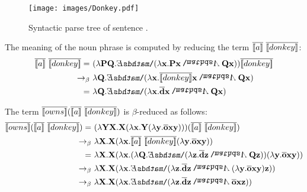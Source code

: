 \begin{figure}[h!]
 \centering
    \texttt{[image: images/Donkey.pdf]}
\caption{Syntactic parse tree of sentence .} \label{fig:donkey-copy}
\end{figure}

\begin{example}

The meaning of the noun phrase  is computed by reducing the term $\overline{[\![a]\!]} \ \overline{[\![donkey]\!]} $:
\begin{align*}
 \tr{\I{a}} \ \tr{\I{donkey}}   = \ & (\lambda \P2 \Q2. \ex2 (\lambda \x2.  \P2 \x2 \cnj2 \Q2 \x2 ) ) \tr{\I{donkey}}   \\
 \bconv \ &  \lambda  \Q2. \ex2 (\lambda \x2.  \tr{\I{donkey}} \x2  \cnj2  \Q2 \x2 ) \\
= \ &  \lambda  \Q2. \ex2 (\lambda \x2.  \tr{\cdonkey} \x2  \cnj2  \Q2 \x2 )
\end{align*}

The term $ \tr{\I{owns}}  (\tr{\I{a}} \ \tr{\I{donkey}}) $ is $\beta$-reduced as follows:
\begin{align*}
\tr{\I{owns}}  (\tr{\I{a}} \ \tr{\I{donkey}} ) = \ & ( \lambda \Y2 \X2. \X2 ( \lambda \x2. \Y2 (\lambda \y2.  \tr{\cown}  \x2 \y2 )))  (\tr{\I{a}} \ \tr{\I{donkey}} ) \\
\bconv \ &   \lambda \X2. \X2 ( \lambda \x2. \tr{\I{a}} \ \tr{\I{donkey}} (\lambda \y2.  \tr{\cown}  \x2 \y2 ))   \\
= \ &  \lambda \X2. \X2 ( \lambda \x2. ( \lambda  \Q2. \ex2 (\lambda \z2.  \tr{\cdonkey} \z2 \cnj2 \Q2 \z2 ) ) (\lambda \y2.  \tr{\cown}  \x2 \y2 ))   \\
\bconv \ &  \lambda \X2. \X2 ( \lambda \x2. \ex2 (\lambda \z2.  \tr{\cdonkey} \z2 \cnj2  (\lambda \y2.  \tr{\cown}  \x2 \y2 ) \z2   ))   \\
\bconv \ & \lambda \X2. \X2 ( \lambda \x2.  \ex2 (\lambda \z2. \tr{\cdonkey}  \z2 \cnj2  \tr{\cown}  \x2 \z2 ))  
\end{align*}


\end{example}
